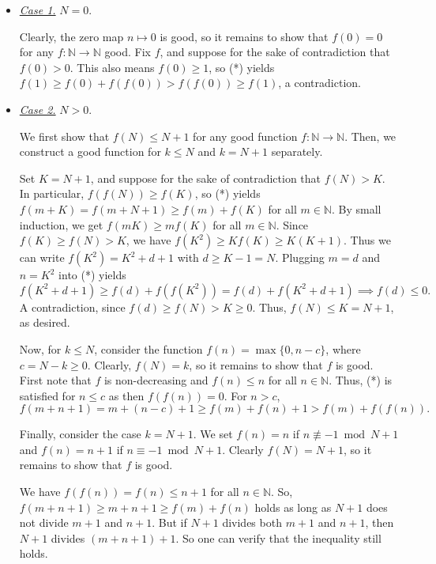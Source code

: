 \documentclass{article}
\newcommand{\N}{\mathbb{N}}
\begin{document}
\begin{itemize}

    \item
    \textit{\underline{Case 1.}}
    $N = 0$.

    Clearly, the zero map $n \mapsto 0$ is good, so it remains to show that $f(0) = 0$ for any $f : \N \to \N$ good.
    Fix $f$, and suppose for the sake of contradiction that $f(0) > 0$.
    This also means $f(0) \geq 1$, so (*) yields $f(1) \geq f(0) + f(f(0)) > f(f(0)) \geq f(1)$, a contradiction.

    \item
    \textit{\underline{Case 2.}}
    $N > 0$.

    We first show that $f(N) \leq N + 1$ for any good function $f : \N \to \N$.
    Then, we construct a good function for $k \leq N$ and $k = N + 1$ separately.

    Set $K = N + 1$, and suppose for the sake of contradiction that $f(N) > K$.
    In particular, $f(f(N)) \geq f(K)$, so (*) yields $f(m + K) = f(m + N + 1) \geq f(m) + f(K)$ for all $m \in \N$.
    By small induction, we get $f(mK) \geq m f(K)$ for all $m \in \N$.
    Since $f(K) \geq f(N) > K$, we have $f(K^2) \geq K f(K) \geq K (K + 1)$.
    Thus we can write $f(K^2) = K^2 + d + 1$ with $d \geq K - 1 = N$.
    Plugging $m = d$ and $n = K^2$ into (*) yields
    \[ f(K^2 + d + 1) \geq f(d) + f(f(K^2)) = f(d) + f(K^2 + d + 1) \implies f(d) \leq 0. \]
    A contradiction, since $f(d) \geq f(N) > K \geq 0$.
    Thus, $f(N) \leq K = N + 1$, as desired.

    Now, for $k \leq N$, consider the function $f(n) = \max\{0, n - c\}$, where $c = N - k \geq 0$.
    Clearly, $f(N) = k$, so it remains to show that $f$ is good.
    First note that $f$ is non-decreasing and $f(n) \leq n$ for all $n \in \N$.
    Thus, (*) is satisfied for $n \leq c$ as then $f(f(n)) = 0$.
    For $n > c$,
    \[ f(m + n + 1) = m + (n - c) + 1 \geq f(m) + f(n) + 1 > f(m) + f(f(n)). \]

    Finally, consider the case $k = N + 1$.
    We set $f(n) = n$ if $n \not\equiv -1 \bmod{N + 1}$ and $f(n) = n + 1$ if $n \equiv -1 \bmod{N + 1}$.
    Clearly $f(N) = N + 1$, so it remains to show that $f$ is good.
    
    We have $f(f(n)) = f(n) \leq n + 1$ for all $n \in \N$.
    So, $f(m + n + 1) \geq m + n + 1 \geq f(m) + f(n)$ holds as long as $N + 1$ does not divide $m + 1$ and $n + 1$.
    But if $N + 1$ divides both $m + 1$ and $n + 1$, then $N + 1$ divides $(m + n + 1) + 1$.
    So one can verify that the inequality still holds.

\end{itemize}
\end{document}
